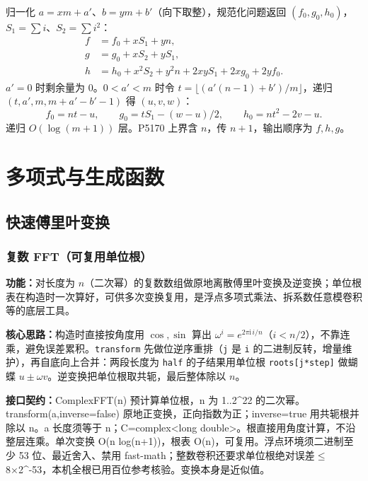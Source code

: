 归一化 $a=xm+a'$、$b=ym+b'$（向下取整），规范化问题返回 $(f_0,g_0,h_0)$，$S_1=\sum i$、$S_2=\sum i^2$：
\[
\begin{aligned}
f&=f_0+xS_1+yn,\\
g&=g_0+xS_2+yS_1,\\
h&=h_0+x^2S_2+y^2n+2xyS_1+2xg_0+2yf_0.
\end{aligned}
\]
$a'=0$ 时剩余量为 0。$0<a'<m$ 时令 $t=\lfloor(a'(n-1)+b')/m\rfloor$，递归 $(t,a',m,m+a'-b'-1)$ 得 $(u,v,w)$：
\[
f_0=nt-u,\qquad g_0=tS_1-(w-u)/2,\qquad h_0=nt^2-2v-u.
\]
递归 $O(\log(m+1))$ 层。P5170 上界含 $n$，传 $n+1$，输出顺序为 $f,h,g$。


\Needspace{511pt}

\chapter{多项式与生成函数}

\section{快速傅里叶变换}

\subsection{复数 FFT（可复用单位根）}\label{compact-ComplexFFT}

\noindent\textbf{功能：}\allowbreak 对长度为 $n$（二次幂）的复数数组做原地离散傅里叶变换及逆变换；单位根表在构造时一次算好，可供多次变换复用，是浮点多项式乘法、拆系数任意模卷积等的底层工具。

\textbf{核心思路：}\allowbreak 构造时直接按角度用 $\cos,\sin$ 算出 $\omega^i=e^{2\pi\mathrm{i}\,i/n}$（$i<n/2$），不靠连乘，避免误差累积。\texttt{transform} 先做位逆序重排（\texttt{j} 是 \texttt{i} 的二进制反转，增量维护），再自底向上合并：两段长度为 \texttt{half} 的子结果用单位根 \texttt{roots[j*step]} 做蝴蝶 $u\pm\omega v$。逆变换把单位根取共轭，最后整体除以 $n$。



{\sloppy{}\noindent\textbf{接口契约：}ComplexFFT(n) 预计算单位根，n 为 1..2\textasciicircum{}22 的二次幂。transform(a,inverse=false) 原地正变换，正向指数为正；inverse=true 用共轭根并除以 n。a 长度须等于 n；C=complex<long double>。根直接用角度计算，不沿整层连乘。单次变换 O(n log(n+1))，根表 O(n)，可复用。浮点环境须二进制至少 53 位、最近舍入、禁用 fast-math；整数卷积还要求单位根绝对误差$\le$8×2\textasciicircum{}-53，本机全根已用百位参考核验。变换本身是近似值。\par}

